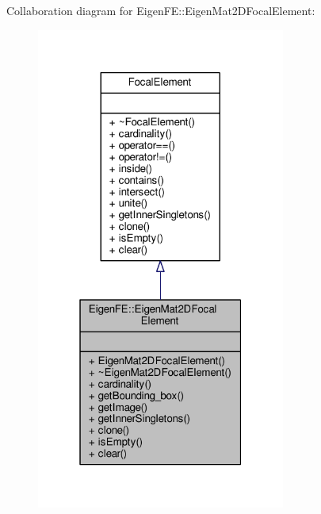 Collaboration diagram for Eigen\+FE\+:\+:Eigen\+Mat2\+D\+Focal\+Element\+:\nopagebreak
\begin{figure}[H]
\begin{center}
\leavevmode
\includegraphics[width=232pt]{classEigenFE_1_1EigenMat2DFocalElement__coll__graph}
\end{center}
\end{figure}
